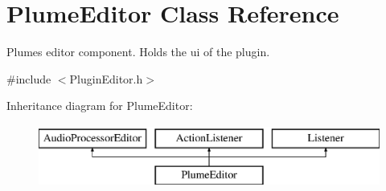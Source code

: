 \hypertarget{class_plume_editor}{}\section{Plume\+Editor Class Reference}
\label{class_plume_editor}


Plume\textquotesingle{}s editor component. Holds the ui of the plugin.  




{\ttfamily \#include $<$Plugin\+Editor.\+h$>$}

Inheritance diagram for Plume\+Editor\+:\begin{figure}[H]
\begin{center}
\leavevmode
\includegraphics[height=2.000000cm]{class_plume_editor}
\end{center}
\end{figure}
